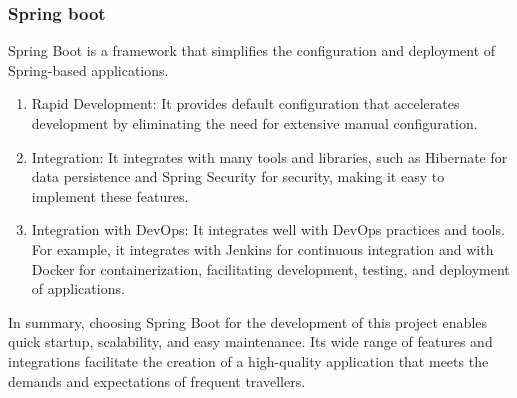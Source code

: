 \documentclass[../memory.tex]{subfiles}
\begin{document}
\subsubsection{Spring boot}
Spring Boot is a framework that simplifies the configuration and deployment of
Spring-based applications.
\begin{enumerate}[label = -]
	\item Rapid Development: It provides default configuration that accelerates
	      development by eliminating the need for extensive manual configuration.
	\item Integration: It integrates with many tools and libraries, such as
	      Hibernate for data persistence and Spring Security for security, making it
	      easy to implement these features.
	\item Integration with DevOps: It integrates well with DevOps practices and
	      tools. For example, it integrates with Jenkins for continuous integration
	      and with Docker for containerization, facilitating development, testing, and
	      deployment of applications.
\end{enumerate}
In summary, choosing Spring Boot for the development of this project enables
quick startup, scalability, and easy maintenance. Its wide range of features and
integrations facilitate the creation of a high-quality application that meets
the demands and expectations of frequent travellers.
\end{document}
